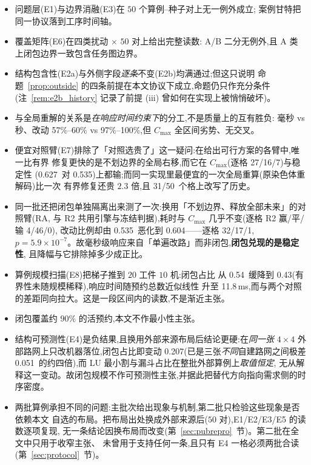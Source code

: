 \documentclass[manuscript,screen,review]{acmart}
\newcommand{\NPairs}{50}
\newcommand{\ResFracRtwo}{57\%--60\%}
\newcommand{\ResFracRzero}{97\%--100\%}
\newcommand{\ClosureAliveFrac}{90\%}
\newcommand{\NPubPairs}{50}
\newcommand{\PubCloSpread}{0.207}
\newcommand{\SelfCloSpread}{0.051}
\newcommand{\RedecodeBad}{31/\NPairs}
\newcommand{\WinVsShift}{27/16/7}    %
\newcommand{\WinVsAllFuture}{4/46/0}
\newcommand{\ResFracCheapRtwo}{0.535}
\newcommand{\ResFracShift}{0.627}
\newcommand{\ResFracAllFuture}{0.604}
\newcommand{\RAStabWTL}{32/17/1}     %
\newcommand{\RAStabP}{5.9\times10^{-7}}  %
\newcommand{\ScaleJobsHi}{20}
\newcommand{\ScaleMachHi}{10}
\newcommand{\ScaleCloLo}{0.43}       %
\newcommand{\ScaleCloHi}{0.54}       %
\newcommand{\ScaleMsHi}{11.8}        %
\begin{document}
\begin{itemize}[leftmargin=1.5em,itemsep=0.25em]
\item 问题层(E1)与边界消融(E3)在 \(\NPairs\) 个算例--种子对上无一例外成立;
案例甘特把同一协议落到工序时间轴。
\item 覆盖矩阵(E6)在四类扰动 \(\times\) \(\NPairs\) 对上给出完整读数:
A/B 二分无例外,且 A 类上闭包边界一致包含任务图边界。
\item 结构包含性(E2a)与外侧字段\emph{逐条}不变(E2b)均满通过;但这只说明
命题~\ref{prop:outside} 的四条前提在本文协议下成立,命题仍只作充分条件
(注~\ref{rem:e2b_history} 记录了前提 (iii) 曾如何在实现上被悄悄破坏)。
\item 与全局重解的关系是\emph{在响应时间约束下}的分工,不是质量上的互有胜负:
毫秒 vs 秒、改动 \ResFracRtwo{} vs \ResFracRzero{},但 \(C_{\max}\) 全区间劣势、无交叉。
\item 便宜对照臂(E7)排除了「对照选贵了」这一疑问:在给出可行方案的各臂中,唯一比有界
修复更快的是不划边界的全局右移,而它在 \(C_{\max}\)(逐格 \WinVsShift)与稳定性
(\ResFracShift\ 对 \ResFracCheapRtwo)上都输;而同一实现里最便宜的一次全局重算(原染色体重解码)比一次
有界修复还贵 \(2.3\) 倍,且 \RedecodeBad\ 个格上改写了历史。
\item 同一批还把闭包单独隔离出来测了一次:换用「不划边界、释放全部未来」的对照臂(RA,
与 R2 共用引擎与冻结判据),耗时与 \(C_{\max}\) 几乎不变(逐格 R2 赢/平/输 \WinVsAllFuture),
改动比例却由 \ResFracCheapRtwo\ 恶化到 \ResFracAllFuture——逐格 \RAStabWTL,
\(p=\RAStabP\)。故毫秒级响应来自「单遍改路」而非闭包,\textbf{闭包兑现的是稳定性},
且降幅与它排除掉多少成正比。
\item 算例规模扫描(E8)把梯子推到 \(\ScaleJobsHi\) 工件 \(\ScaleMachHi\) 机:闭包占比
从 \ScaleCloHi\ 缓降到 \ScaleCloLo(有界性未随规模稀释),响应时间随预约总数近似线性
升至 \ScaleMsHi\,ms,而与两个对照的差距同向拉大。这是一段区间内的读数,不是渐近主张。
\item 闭包覆盖约 \(\ClosureAliveFrac\) 的活预约,本文不作最小性主张。
\item 结构可预测性(E4)是负结果,且换用外部来源布局后结论更硬:在\emph{同一张} \(4\times 4\)
外部路网上只改机器落位,闭包占比即变动 \PubCloSpread(已是三张\emph{不同}自建路网之间极差
\SelfCloSpread\ 的约四倍),而 LU 最小割与漏斗占比在整批外部算例上\emph{取值恒定},
无从解释这一变动。故闭包规模不作可预测性主张,并据此把替代方向指向需求侧的时序密度。
\item 两批算例承担不同的问题:主批次给出现象与机制,第二批只检验这些现象是否依赖本文
自选的布局。把布局出处换成外部来源后(\(\NPubPairs\) 对),E1/E2/E3/E5 的读数逐项复现,
无一条结论因换布局而改变(第~\ref{sec:pubrepro}~节)。第二批在全文中只用于收窄主张、
未曾用于支持任何一条,且只有 E4 一格必须两批合读(第~\ref{sec:protocol}~节)。
\end{itemize}
\end{document}
